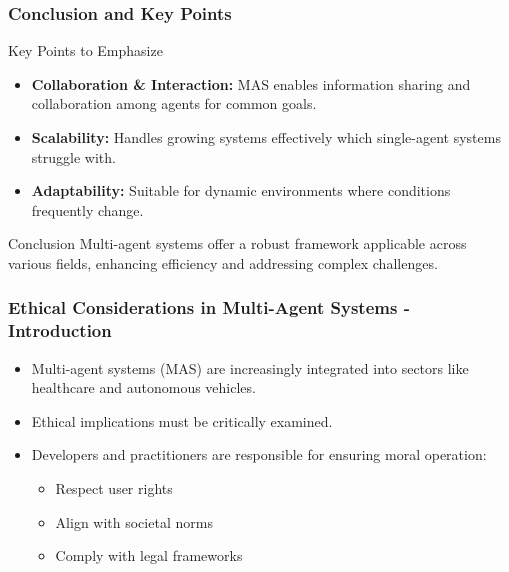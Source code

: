 \documentclass[aspectratio=169]{beamer}
\begin{document}
\begin{frame}[fragile]
    \frametitle{Conclusion and Key Points}
    \begin{block}{Key Points to Emphasize}
        \begin{itemize}
            \item \textbf{Collaboration \& Interaction:} MAS enables information sharing and collaboration among agents for common goals.
            \item \textbf{Scalability:} Handles growing systems effectively which single-agent systems struggle with.
            \item \textbf{Adaptability:} Suitable for dynamic environments where conditions frequently change.
        \end{itemize}
    \end{block}
    \begin{block}{Conclusion}
        Multi-agent systems offer a robust framework applicable across various fields, enhancing efficiency and addressing complex challenges.
    \end{block}
\end{frame}

\begin{frame}[fragile]
    \frametitle{Ethical Considerations in Multi-Agent Systems - Introduction}
    \begin{itemize}
        \item Multi-agent systems (MAS) are increasingly integrated into sectors like healthcare and autonomous vehicles.
        \item Ethical implications must be critically examined.
        \item Developers and practitioners are responsible for ensuring moral operation:
            \begin{itemize}
                \item Respect user rights
                \item Align with societal norms
                \item Comply with legal frameworks
            \end{itemize}
    \end{itemize}
\end{frame}
\end{document}
